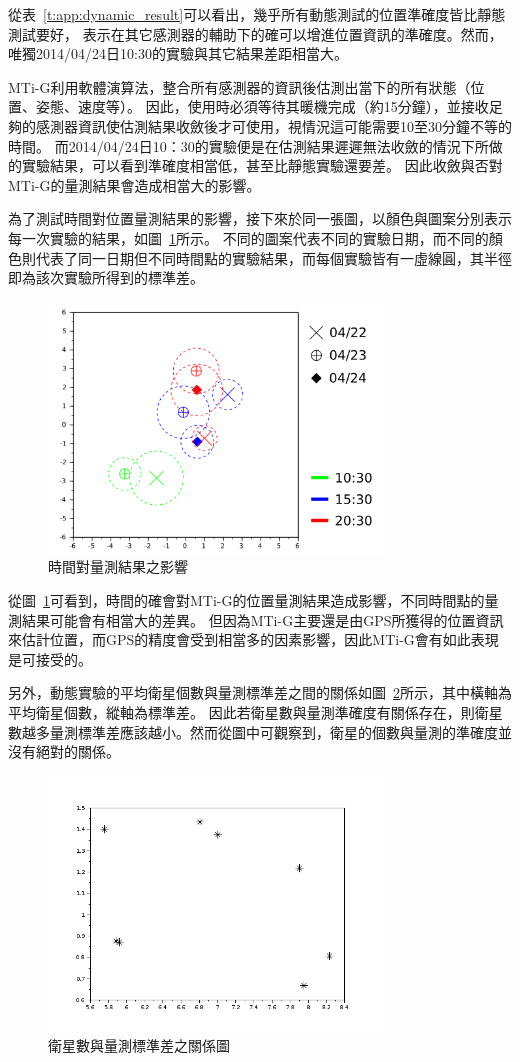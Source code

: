 從表~\ref{t:app:dynamic_result}可以看出，幾乎所有動態測試的位置準確度皆比靜態測試要好，
表示在其它感測器的輔助下的確可以增進位置資訊的準確度。然而，唯獨2014/04/24日10:30的實驗與其它結果差距相當大。

MTi-G利用軟體演算法，整合所有感測器的資訊後估測出當下的所有狀態（位置、姿態、速度等）。
因此，使用時必須等待其暖機完成（約15分鐘），並接收足夠的感測器資訊使估測結果收斂後才可使用，視情況這可能需要10至30分鐘不等的時間。
而2014/04/24日10：30的實驗便是在估測結果遲遲無法收斂的情況下所做的實驗結果，可以看到準確度相當低，甚至比靜態實驗還要差。
因此收斂與否對MTi-G的量測結果會造成相當大的影響。

為了測試時間對位置量測結果的影響，接下來於同一張圖，以顏色與圖案分別表示每一次實驗的結果，如圖~\ref{f:app:timediff}所示。
不同的圖案代表不同的實驗日期，而不同的顏色則代表了同一日期但不同時間點的實驗結果，而每個實驗皆有一虛線圓，其半徑即為該次實驗所得到的標準差。
\begin{figure}[h!]
	\centering
	\includegraphics[width=0.8\textwidth]{figures/appendix1/timediff.png}
	\caption{時間對量測結果之影響}
	\label{f:app:timediff}
\end{figure}

從圖~\ref{f:app:timediff}可看到，時間的確會對MTi-G的位置量測結果造成影響，不同時間點的量測結果可能會有相當大的差異。
但因為MTi-G主要還是由GPS所獲得的位置資訊來估計位置，而GPS的精度會受到相當多的因素影響，因此MTi-G會有如此表現是可接受的。

另外，動態實驗的平均衛星個數與量測標準差之間的關係如圖~\ref{f:app:Sigma-N}所示，其中橫軸為平均衛星個數，縱軸為標準差。
因此若衛星數與量測準確度有關係存在，則衛星數越多量測標準差應該越小。然而從圖中可觀察到，衛星的個數與量測的準確度並沒有絕對的關係。
\begin{figure}[t!]
	\centering
	\includegraphics[width=0.8\textwidth]{figures/appendix1/Sigma-N}
	\caption{衛星數與量測標準差之關係圖}
	\label{f:app:Sigma-N}
\end{figure}

